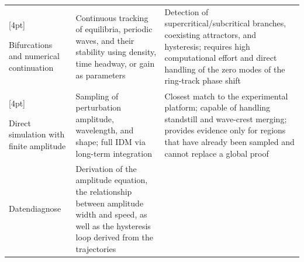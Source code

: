 \documentclass[11pt,a4paper,openany]{book}
\numberwithin{equation}{chapter}
\numberwithin{figure}{chapter}
\numberwithin{table}{chapter}
\begin{document}
\begin{center}
\begin{tabular}{p{3.0cm}p{5.0cm}p{5.7cm}}
\\

[4pt]

Bifurcations and numerical continuation






&






Continuous tracking of equilibria, periodic waves, and their stability using density, time headway, or gain as parameters






&






Detection of supercritical/subcritical branches, coexisting attractors, and hysteresis; requires high computational effort and direct handling of the zero modes of the ring-track phase shift






\\

[4pt]

Direct simulation with finite amplitude






&






Sampling of perturbation amplitude, wavelength, and shape; full IDM via long-term integration






&






Closest match to the experimental platform; capable of handling standstill and wave-crest merging; provides evidence only for regions that have already been sampled and cannot replace a global proof





\\[4pt]

Datendiagnose




&






Derivation of the amplitude equation, the relationship between amplitude width and speed, as well as the hysteresis loop derived from the trajectories







\end{tabular}
\end{center}
\end{document}
